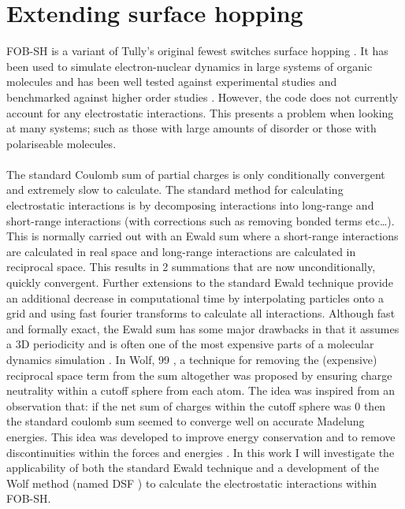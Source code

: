 \chapter{Extending surface hopping}
\label{chap:surface_hopping_ES}

\noindent FOB-SH is a variant of Tully's original fewest switches surface hopping \cite{FSSH_orig}. It has been used to simulate electron-nuclear dynamics in large systems of organic molecules and has been well tested against experimental studies and benchmarked against higher order studies \cite{FlickPolarons, Giannini2018Crossover, Giannini2019,             C9TC05270D, Carof2017FSSH, C9FD00046A, C9CP04770K, FOB-SH_Spencer,        C6FD00107F}. However, the code does not currently account for any electrostatic interactions. This presents a problem when looking at many systems; such as those with large amounts of disorder or those with polariseable molecules. 
\\\\
The standard Coulomb sum of partial charges is only conditionally convergent and extremely slow to calculate. The standard method for calculating electrostatic interactions is by decomposing interactions into long-range and short-range interactions (with corrections such as removing bonded terms etc\ldots). This is normally carried out with an Ewald sum \cite{Ewald} where a short-range interactions are calculated in real space and long-range interactions are calculated in reciprocal space. This results in 2 summations that are now unconditionally, quickly convergent. Further extensions to the standard Ewald technique provide an additional decrease in computational time by interpolating particles onto a grid and using fast fourier transforms to calculate all interactions. Although fast and formally exact, the Ewald sum has some major drawbacks in that it assumes a 3D periodicity and is often one of the most expensive parts of a molecular dynamics simulation \cite{EwaldReview}. In Wolf, 99 \cite{Wolf99}, a technique for removing the (expensive) reciprocal space term from the sum altogether was proposed by ensuring charge neutrality within a cutoff sphere from each atom. The idea was inspired from an observation that: if the net sum of charges within the cutoff sphere was 0 then the standard coulomb sum seemed to converge well on accurate Madelung energies. This idea was developed to improve energy conservation and to remove discontinuities within the forces and energies \cite{Zahn2002, DSF}. In this work I will investigate the applicability of both the standard Ewald technique and a development of the Wolf method (named DSF \cite{DSF}) to calculate the electrostatic interactions within FOB-SH.
